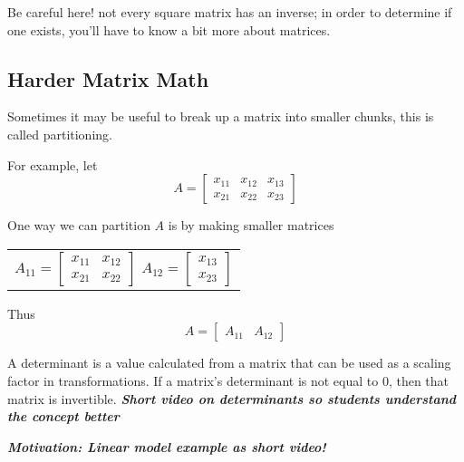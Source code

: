 \documentclass[a4paper]{article}
\begin{document}
Be careful here! not every square matrix has an inverse; in order to determine if one exists, you'll have to know a bit more about matrices.
    
  \subsection{Harder Matrix Math}

Sometimes it may be useful to break up a matrix into smaller chunks, this is called partitioning. 

For example, let
$$A = \begin{bmatrix}
    x_{11} & x_{12} & x_{13}\\
    x_{21} & x_{22} & x_{23}
  \end{bmatrix}$$

One way we can partition $A$ is by making smaller matrices

\begin{center}
\begin{tabular}{c}
 $A_{11} = \begin{bmatrix}
       x_{11} & x_{12}\\
       x_{21} & x_{22}
       \end{bmatrix}$
 $ A_{12} = \begin{bmatrix}
          x_{13}\\
          x_{23}
         \end{bmatrix}$
 \end{tabular}               
\end{center}

Thus $$A=\begin{bmatrix} A_{11} & A_{12} \end{bmatrix}$$

A determinant is a value calculated from a matrix that can be used as a scaling factor in transformations. If a matrix's determinant is not equal to 0, then that matrix is invertible.
\textbf{\textit{Short video on determinants so students understand the concept better}}

\textbf{\textit{Motivation: Linear model example as short video!}}


    
\end{document}
